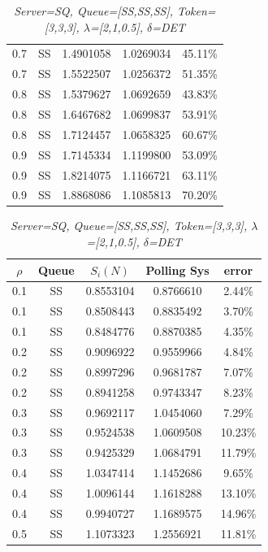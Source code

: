 \documentclass[12pt,a4paper,italian]{article}
\begin{document}
\begin{table}[ht!]
\begin{minipage}[b]{0.48\linewidth}
\begin{tabular}{c c c c c}
		 0.7 & SS & 1.4901058 &   1.0269034    & 45.11\% \\
		 0.7 & SS & 1.5522507 &   1.0256372    & 51.35\% \\ \hline \hline
		 0.8 & SS & 1.5379627 &   1.0692659    & 43.83\% \\
		 0.8 & SS & 1.6467682 &   1.0699837    & 53.91\% \\
		 0.8 & SS & 1.7124457 &   1.0658325    & 60.67\% \\ \hline \hline
		 0.9 & SS & 1.7145334 &   1.1199800    & 53.09\% \\
		 0.9 & SS & 1.8214075 &   1.1166721    & 63.11\% \\
		 0.9 & SS & 1.8868086 &   1.1085813    & 70.20\% \\ \hline

		\end{tabular}
	\end{minipage}
	\hspace{0.5cm}
	\begin{minipage}[b]{0.48\linewidth}
		\centering
		\caption{\scriptsize \emph{Server=SQ, Queue=[SS,SS,SS], Token=[3,3,3], $\lambda$=[2,1,0.5], $\delta$=DET}}
		\label{tab8}
		\tiny
		\begin{tabular}{c c c c c}
			\hline
			$\rho$ & Queue & $S_i(N)$ & Polling Sys & error \\ \hline
			0.1 & SS & 0.8553104 &   0.8766610    & 2.44\%  \\
			0.1 & SS & 0.8508443 &   0.8835492    & 3.70\%  \\
			0.1 & SS & 0.8484776 &   0.8870385    & 4.35\%  \\\hline \hline
			0.2 & SS & 0.9096922 &   0.9559966    & 4.84\%  \\
			0.2 & SS & 0.8997296 &   0.9681787    & 7.07\%  \\
			0.2 & SS & 0.8941258 &   0.9743347    & 8.23\%  \\\hline \hline
			0.3 & SS & 0.9692117 &   1.0454060    & 7.29\%  \\
			0.3 & SS & 0.9524538 &   1.0609508    & 10.23\% \\
			0.3 & SS & 0.9425329 &   1.0684791    & 11.79\% \\\hline \hline
			0.4 & SS & 1.0347414 &   1.1452686    & 9.65\%  \\
			0.4 & SS & 1.0096144 &   1.1618288    & 13.10\% \\
			0.4 & SS & 0.9940727 &   1.1689575    & 14.96\% \\\hline \hline
			0.5 & SS & 1.1073323 &   1.2556921    & 11.81\% \\

\end{tabular}
\end{minipage}
\end{table}
\end{document}
